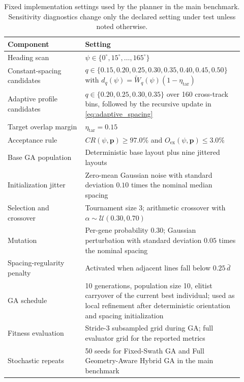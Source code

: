 \documentclass[jmse,article,submit,moreauthors]{Definitions/mdpi}
\begin{document}
\begin{table}[!htbp]
	\centering
	\caption{Fixed implementation settings used by the planner in the main benchmark. Sensitivity diagnostics change only the declared setting under test unless noted otherwise.}
	\label{tab:planner_settings}
	\scriptsize
	\renewcommand{\arraystretch}{1.12}
	\setlength{\tabcolsep}{3.8pt}
	\begin{tabular}{@{}p{0.31\linewidth}p{0.61\linewidth}@{}}
		\toprule[1bp]
		\textbf{Component} & \textbf{Setting} \\
		\midrule[1bp]
		Heading scan & $\psi \in \{0^{\circ},15^{\circ},\ldots,165^{\circ}\}$ \\
		Constant-spacing candidates & $q \in \{0.15,0.20,0.25,0.30,0.35,0.40,0.45,0.50\}$ with $d_q(\psi)=\widetilde{W}_{q}(\psi)(1-\eta_{\mathrm{tar}})$ \\
		Adaptive profile candidates & $q \in \{0.20,0.25,0.30,0.35\}$ over 160 cross-track bins, followed by the recursive update in \eqref{eq:adaptive_spacing} \\
		Target overlap margin & $\eta_{\mathrm{tar}}=0.15$ \\
		Acceptance rule & $CR(\psi,\mathbf{p}) \ge 97.0\%$ and $O_{\mathrm{ex}}(\psi,\mathbf{p}) \le 3.0\%$ \\
		Base GA population & Deterministic base layout plus nine jittered layouts \\
		Initialization jitter & Zero-mean Gaussian noise with standard deviation $0.10$ times the nominal median spacing \\
		Selection and crossover & Tournament size 3; arithmetic crossover with $\alpha \sim \mathcal{U}(0.30,0.70)$ \\
		Mutation & Per-gene probability 0.30; Gaussian perturbation with standard deviation $0.05$ times the nominal spacing \\
		Spacing-regularity penalty & Activated when adjacent lines fall below $0.25\,\bar d$ \\
		GA schedule & 10 generations, population size 10, elitist carryover of the current best individual; used as local refinement after deterministic orientation and spacing initialization \\
		Fitness evaluation & Stride-3 subsampled grid during GA; full evaluator grid for the reported metrics \\
		Stochastic repeats & 50 seeds for Fixed-Swath GA and Full Geometry-Aware Hybrid GA in the main benchmark \\
		\bottomrule[1bp]
	\end{tabular}
\end{table}
\end{document}
